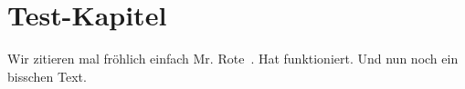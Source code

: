 \section{Test-Kapitel}

Wir zitieren mal fröhlich einfach Mr. Rote~\cite{asano11shortestpath}. Hat funktioniert. Und nun noch ein bisschen Text.
\lipsum
\lipsum
